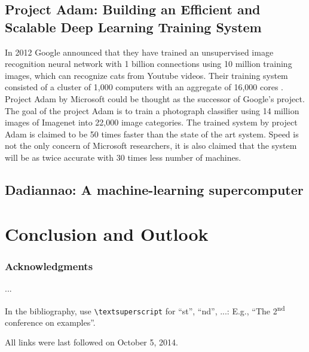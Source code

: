 \documentclass[runningheads,a4paper]{llncs}
\begin{document}
\subsection*{Project Adam: Building an Efficient and Scalable Deep Learning Training System \cite{chilimbi2014project}}
In 2012 Google announced that they have trained an unsupervised image recognition neural network with 1 billion connections using 10 million training images, which can recognize cats from Youtube videos. Their training system consisted of a cluster of 1,000 computers with an aggregate of 16,000 cores \cite{le2013building}.\\

Project Adam by Microsoft could be thought as the successor of Google's project. The goal of the project Adam is to train a photograph classifier using 14 million images of Imagenet \cite{deng2009imagenet} into 22,000 image categories. The trained system by project Adam is claimed to be 50 times faster than the state of the art system. Speed is not the only concern of Microsoft researchers, it is also claimed that the system will be as twice accurate with 30 times less number of machines.\\


\subsection*{Dadiannao: A machine-learning supercomputer \cite{chen2014dadiannao}}
\newpage
\section{Conclusion and Outlook}

\subsubsection*{Acknowledgments}
...

In the bibliography, use \texttt{\textbackslash textsuperscript} for ``st'', ``nd'', ...:
E.g., \enquote{The 2\textsuperscript{nd} conference on examples}.




All links were last followed on October 5, 2014.
\nocite{*}
\end{document}
